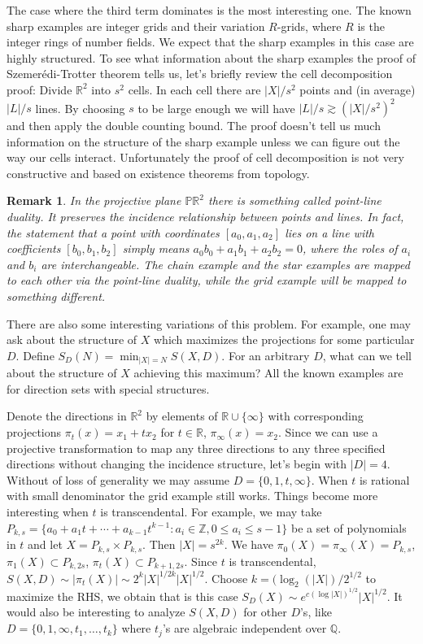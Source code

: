 \documentclass[12pt]{amsart}
\newtheorem{remark}[theorem]{Remark}
\begin{document}
The case where the third term dominates is the most interesting one. The known sharp examples are integer grids and their variation $R$-grids, where $R$ is the integer rings of number fields. We expect that the sharp examples in this case are highly structured. To see what information about the sharp examples the proof of Szemer\'edi-Trotter theorem tells us, let's briefly review the cell decomposition proof: Divide $\mathbb{R}^2$ into $s^2$ cells. In each cell there are $|X|/s^2$ points and (in average) $|L|/s$ lines. By choosing $s$ to be large enough we will have $|L|/s \gtrsim (|X|/s^2)^2$ and then apply the double counting bound. The proof doesn't tell us much information on the structure of the sharp example unless we can figure out the way our cells interact. Unfortunately the proof of cell decomposition is not very constructive and based on existence theorems from topology.

\begin{remark}
    In the projective plane $\mathbb{P} \mathbb{R}^2$ there is something called point-line duality. It preserves the incidence relationship between points and lines. In fact, the statement that a point with coordinates $[a_0, a_1 , a_2]$ lies on a line with coefficients $[b_0, b_1, b_2]$ simply means $a_0 b_0 + a_1 b_1 +  a_2 b_2 = 0$, where the roles of $a_i$ and $b_i$ are interchangeable. The chain example and the star examples are mapped to each other via the point-line duality, while  the grid example will be mapped to something different. 
\end{remark}

There are also some interesting variations of this problem. For example, one may ask about the structure of $X$ which maximizes the projections for some particular $D$. Define $S_D(N) = \min_{|X|=N} S(X,D)$. For an arbitrary $D$, what can we tell about the structure of $X$ achieving this maximum? All the known examples are for direction sets with special structures.  

Denote the directions in $\mathbb{R}^2$ by elements of $\mathbb{R} \cup \{\infty\}$ with corresponding projections $\pi_t(x) = x_1+tx_2$ for $t \in \mathbb{R}$, $\pi_\infty(x) = x_2$. Since we can use a projective transformation to map any three directions to any three specified directions without changing the incidence structure, let's begin with $|D|=4$. Without of loss of generality we may assume $D = \{0,1,t,\infty\}$. When $t$ is rational with small denominator the grid example still works. Things become more interesting when $t$ is transcendental. For example, we may take $P_{k,s} = \{a_0 + a_1 t + \cdots + a_{k-1} t^{k-1}: a_i \in \mathbb{Z}, 0 \le a_i \le s-1\}$ be a set of polynomials in $t$ and let $X = P_{k,s} \times P_{k,s}$. Then $|X| = s^{2k}$. We have $\pi_0(X) = \pi_\infty(X) = P_{k,s}$, $\pi_1(X) \subset P_{k,2s}$, $\pi_t(X) \subset P_{k+1,2s}$. Since $t$ is transcendental, $S(X,D) \sim |\pi_t(X)| \sim  2^k |X|^{1/2k} |X|^{1/2}$. Choose $k = (\log_2(|X|)/2^{1/2}$ to maximize the RHS, we obtain that is this case $S_D(X) \sim e^{c(\log|X|)^{1/2}} |X|^{1/2}$. It would also be interesting to analyze $S(X,D)$ for other $D$'s, like $D=\{0,1,\infty,t_1,\ldots,t_k\}$ where $t_j$'s are algebraic independent over $\mathbb{Q}$.
\end{document}

